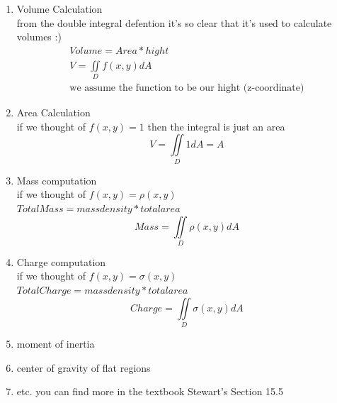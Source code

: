 \documentclass[11pt]{article}
\theoremstyle{definition}
\begin{document}
\begin{enumerate}

\item Volume Calculation 
	\\ from the double integral defention it's so clear that it's used to calculate volumes :)
\begin{align}
	Volume = Area * hight \\
	V = \iint \limits_D f(x,y) dA \\
	\text{we assume the function to be our hight (z-coordinate)}
\end{align}
\item Area Calculation
	\\ if we thought of $f(x,y)=1$ then the integral is just an area
	\begin{equation}
	V = \iint \limits_D 1 dA = A
\end{equation}

\item Mass computation \\
	if we thought of $f(x,y) =\rho(x,y) $
	\\ $Total Mass = mass density * total area$
	\begin{equation}
		Mass = \iint \limits_D \rho(x,y) dA 
	\end{equation}
	
\item Charge computation \\
	if we thought of $f(x,y) =\sigma(x,y) $
	\\ $Total Charge= mass density * total area$
	\begin{equation}
		Charge = \iint \limits_D \sigma(x,y) dA 
	\end{equation}
\item moment of inertia
\item center of gravity of flat regions 
\item etc. you can find more in the textbook Stewart's Section 15.5
\end{enumerate}
\end{document}
